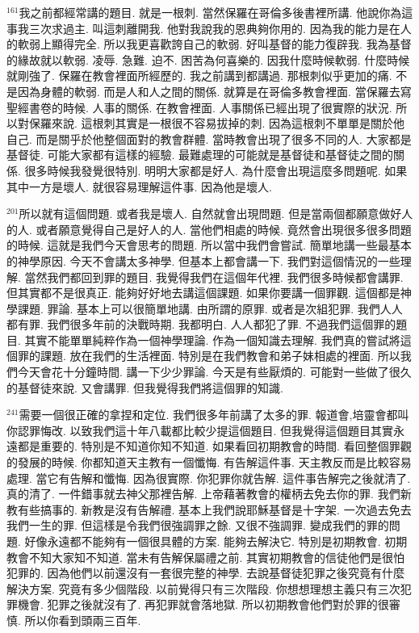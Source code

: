 \documentclass{book}
\begin{document}
$^{161}$我之前都經常講的題目.
就是一根刺.
當然保羅在哥倫多後書裡所講.
他說你為這事我三次求過主.
叫這刺離開我.
他對我說我的恩典夠你用的.
因為我的能力是在人的軟弱上顯得完全.
所以我更喜歡誇自己的軟弱.
好叫基督的能力復辟我.
我為基督的緣故就以軟弱.
凌辱.
急難.
迫不.
困苦為何喜樂的.
因我什麼時候軟弱.
什麼時候就剛強了.
保羅在教會裡面所經歷的.
我之前講到都講過.
那根刺似乎更加的痛.
不是因為身體的軟弱.
而是人和人之間的關係.
就算是在哥倫多教會裡面.
當保羅去寫聖經書卷的時候.
人事的關係.
在教會裡面.
人事關係已經出現了很實際的狀況.
所以對保羅來說.
這根刺其實是一根很不容易拔掉的刺.
因為這根刺不單單是關於他自己.
而是關乎於他整個面對的教會群體.
當時教會出現了很多不同的人.
大家都是基督徒.
可能大家都有這樣的經驗.
最難處理的可能就是基督徒和基督徒之間的關係.
很多時候我發覺很特別.
明明大家都是好人.
為什麼會出現這麼多問題呢.
如果其中一方是壞人.
就很容易理解這件事.
因為他是壞人.

$^{201}$所以就有這個問題.
或者我是壞人.
自然就會出現問題.
但是當兩個都願意做好人的人.
或者願意覺得自己是好人的人.
當他們相處的時候.
竟然會出現很多很多問題的時候.
這就是我們今天會思考的問題.
所以當中我們會嘗試.
簡單地講一些最基本的神學原因.
今天不會講太多神學.
但基本上都會講一下.
我們對這個情況的一些理解.
當然我們都回到罪的題目.
我覺得我們在這個年代裡.
我們很多時候都會講罪.
但其實都不是很真正.
能夠好好地去講這個課題.
如果你要講一個罪觀.
這個都是神學課題.
罪論.
基本上可以很簡單地講.
由所謂的原罪.
或者是次組犯罪.
我們人人都有罪.
我們很多年前的決戰時期.
我都明白.
人人都犯了罪.
不過我們這個罪的題目.
其實不能單單純粹作為一個神學理論.
作為一個知識去理解.
我們真的嘗試將這個罪的課題.
放在我們的生活裡面.
特別是在我們教會和弟子妹相處的裡面.
所以我們今天會花十分鐘時間.
講一下少少罪論.
今天是有些厭煩的.
可能對一些做了很久的基督徒來說.
又會講罪.
但我覺得我們將這個罪的知識.

$^{241}$需要一個很正確的拿捏和定位.
我們很多年前講了太多的罪.
報道會,培靈會都叫你認罪悔改.
以致我們這十年八載都比較少提這個題目.
但我覺得這個題目其實永遠都是重要的.
特別是不知道你知不知道.
如果看回初期教會的時間.
看回整個罪觀的發展的時候.
你都知道天主教有一個懺悔.
有告解這件事.
天主教反而是比較容易處理.
當它有告解和懺悔.
因為很實際.
你犯罪你就告解.
這件事告解完之後就清了.
真的清了.
一件錯事就去神父那裡告解.
上帝藉著教會的權柄去免去你的罪.
我們新教有些搞事的.
新教是沒有告解禮.
基本上我們說耶穌基督是十字架.
一次過去免去我們一生的罪.
但這樣是令我們很強調罪之餘.
又很不強調罪.
變成我們的罪的問題.
好像永遠都不能夠有一個很具體的方案.
能夠去解決它.
特別是初期教會.
初期教會不知大家知不知道.
當未有告解保屬禮之前.
其實初期教會的信徒他們是很怕犯罪的.
因為他們以前還沒有一套很完整的神學.
去說基督徒犯罪之後究竟有什麼解決方案.
究竟有多少個階段.
以前覺得只有三次階段.
你想想理想主義只有三次犯罪機會.
犯罪之後就沒有了.
再犯罪就會落地獄.
所以初期教會他們對於罪的很審慎.
所以你看到頭兩三百年.
\end{document}
